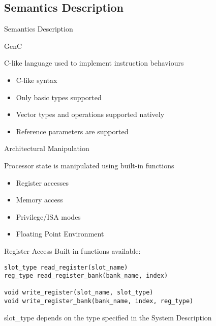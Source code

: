 \subsection{Semantics Description}

\begin{frame}{Semantics Description}
\end{frame}

\begin{frame}{GenC}

C-like language used to implement instruction behaviours
\begin{itemize}
\item C-like syntax
\item Only basic types supported
\item Vector types and operations supported natively
\item Reference parameters are supported
\end{itemize}

\end{frame}

\begin{frame}{Architectural Manipulation}

Processor state is manipulated using built-in functions
\begin{itemize}
\item Register accesses
\item Memory access
\item Privilege/ISA modes
\item Floating Point Environment
\end{itemize}

\end{frame}

\begin{frame}[fragile]{Register Access}
Built-in functions available:
\begin{lstlisting}
slot_type read_register(slot_name)
reg_type read_register_bank(bank_name, index)

void write_register(slot_name, slot_type)
void write_register_bank(bank_name, index, reg_type)
\end{lstlisting}

slot\_type depends on the type specified in the System Description

\end{frame}

